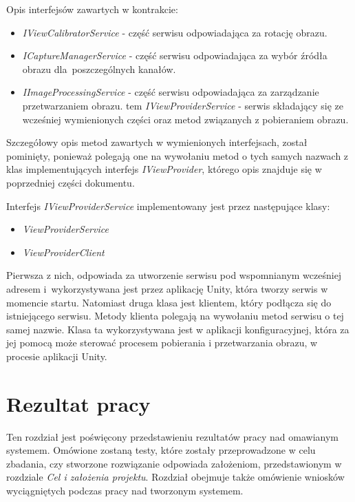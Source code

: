 \documentclass[a4paper,11pt,twoside]{report}
\theoremstyle{definition}
\begin{document}
Opis interfejsów zawartych w kontrakcie:
\begin{itemize}
\item \textit{IViewCalibratorService} - część serwisu odpowiadająca za rotację obrazu.
\item \textit{ICaptureManagerService} - część serwisu odpowiadająca za wybór źródła obrazu dla~poszczególnych kanałów.
\item \textit{IImageProcessingService} - część serwisu odpowiadająca za zarządzanie przetwarzaniem obrazu.
tem \textit{IViewProviderService} - serwis składający się ze wcześniej wymienionych części oraz metod związanych z pobieraniem obrazu.
\end{itemize}

Szczegółowy opis metod zawartych w wymienionych interfejsach, został pominięty, ponieważ polegają one na wywołaniu metod o tych samych nazwach z klas implementujących interfejs \textit{IViewProvider}, którego opis znajduje się w poprzedniej części dokumentu.

Interfejs \textit{IViewProviderService} implementowany jest przez następujące klasy:

\begin{itemize}
\item \textit{ViewProviderService}
\item \textit{ViewProviderClient}
\end{itemize}

Pierwsza z nich, odpowiada za utworzenie serwisu pod wspomnianym wcześniej adresem i~wykorzystywana jest przez aplikację Unity, która tworzy serwis w momencie startu.
Natomiast druga klasa jest klientem, który podłącza się do istniejącego serwisu. Metody klienta polegają na wywołaniu metod serwisu o tej samej nazwie. Klasa ta wykorzystywana jest w aplikacji konfiguracyjnej, która za jej pomocą  może sterować procesem pobierania i przetwarzania obrazu, w procesie aplikacji Unity.

 

\chapter{Rezultat pracy}
Ten rozdział jest poświęcony przedstawieniu rezultatów pracy nad omawianym systemem. Omówione zostaną testy, które zostały przeprowadzone w celu zbadania, czy stworzone rozwiązanie odpowiada założeniom, przedstawionym w rozdziale \textit{Cel i założenia projektu}. Rozdział obejmuje także omówienie wniosków wyciągniętych podczas pracy nad tworzonym systemem. 
\end{document}
